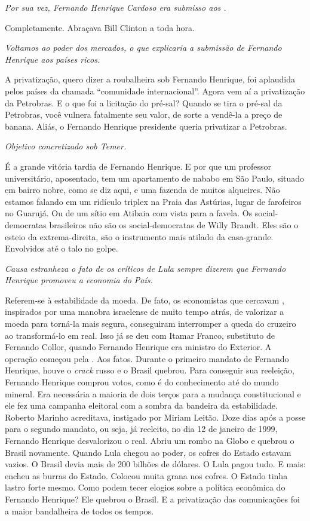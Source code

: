 \itshape
 Por sua vez, Fernando Henrique Cardoso era submisso aos
.

\normalfont 
Completamente. Abraçava Bill Clinton a toda hora.

\itshape
 Voltamos ao poder dos mercados, o que explicaria a
submissão de Fernando Henrique aos países ricos.

\normalfont 
A privatização, quero dizer a roubalheira sob Fernando
Henrique, foi aplaudida pelos países da chamada ``comunidade
internacional''. Agora vem aí a privatização da Petrobras. E o que foi a
licitação do pré-sal? Quando se tira o pré-sal da Petrobras, você
vulnera fatalmente seu valor, de sorte a vendê-la a preço de banana.
Aliás, o Fernando Henrique presidente queria privatizar a Petrobras.

\itshape
 Objetivo concretizado sob Temer.

\normalfont 
É a grande vitória tardia de Fernando Henrique. E por que
um professor universitário, aposentado, tem um apartamento de nababo em
São Paulo, situado em bairro nobre, como se diz aqui, e uma fazenda de
muitos alqueires. Não estamos falando em um ridículo triplex na Praia
das Astúrias, lugar de farofeiros no Guarujá. Ou de um sítio em Atibaia
com vista para a favela. Os social-democratas brasileiros não são os
social-democratas de Willy Brandt. Eles são o esteio da extrema-direita,
são o instrumento mais atilado da casa-grande. Envolvidos até o talo no
golpe.

\itshape
 Causa estranheza o fato de os críticos de Lula sempre
dizerem que Fernando Henrique promoveu a economia do País.

\normalfont 
Referem-se à estabilidade da moeda. De fato, os
economistas que cercavam , inspirados por uma manobra israelense de
muito tempo atrás, de valorizar a moeda para torná-la mais segura,
conseguiram interromper a queda do cruzeiro ao transformá-lo em real.
Isso já se deu com Itamar Franco, substituto de Fernando Collor, quando
Fernando Henrique era ministro do Exterior. A operação começou pela .
Aos fatos. Durante o primeiro mandato de Fernando Henrique, houve o
\emph{crack} russo e o Brasil quebrou. Para conseguir sua reeleição,
Fernando Henrique comprou votos, como é do conhecimento até do mundo
mineral. Era necessária a maioria de dois terços para a mudança
constitucional e ele fez uma campanha eleitoral com a sombra da bandeira
da estabilidade. Roberto Marinho acreditava, instigado por Miriam
Leitão. Doze dias após a posse para o segundo mandato, ou seja, já
reeleito, no dia 12 de janeiro de 1999, Fernando Henrique desvalorizou o
real. Abriu um rombo na Globo e quebrou o Brasil novamente. Quando Lula
chegou ao poder, os cofres do Estado estavam vazios. O Brasil devia mais
de 200 bilhões de dólares. O Lula pagou tudo. E mais: encheu as burras
do Estado. Colocou muita grana nos cofres. O Estado tinha lastro forte
mesmo. Como podem tecer elogios sobre a política econômica do Fernando
Henrique? Ele quebrou o Brasil. E a privatização das comunicações foi a
maior bandalheira de todos os tempos.

